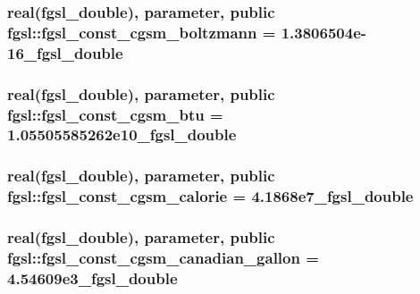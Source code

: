 \hypertarget{classfgsl_abe34761700d2098a3dcde1e962938eb4}{
\subsubsection[{fgsl\-\_\-const\-\_\-cgsm\-\_\-boltzmann}]{\setlength{\rightskip}{0pt plus 5cm}real({\bf fgsl\-\_\-double}), parameter, public fgsl\-::fgsl\-\_\-const\-\_\-cgsm\-\_\-boltzmann = 1.\-3806504e-\/16\-\_\-fgsl\-\_\-double}}\label{classfgsl_abe34761700d2098a3dcde1e962938eb4}
\hypertarget{classfgsl_a01479e6b5bfdbc02efb80e985ca837a6}{
\subsubsection[{fgsl\-\_\-const\-\_\-cgsm\-\_\-btu}]{\setlength{\rightskip}{0pt plus 5cm}real({\bf fgsl\-\_\-double}), parameter, public fgsl\-::fgsl\-\_\-const\-\_\-cgsm\-\_\-btu = 1.\-05505585262e10\-\_\-fgsl\-\_\-double}}\label{classfgsl_a01479e6b5bfdbc02efb80e985ca837a6}
\hypertarget{classfgsl_a82882b4ac09d9b5f5cd25cff0daa2119}{
\subsubsection[{fgsl\-\_\-const\-\_\-cgsm\-\_\-calorie}]{\setlength{\rightskip}{0pt plus 5cm}real({\bf fgsl\-\_\-double}), parameter, public fgsl\-::fgsl\-\_\-const\-\_\-cgsm\-\_\-calorie = 4.\-1868e7\-\_\-fgsl\-\_\-double}}\label{classfgsl_a82882b4ac09d9b5f5cd25cff0daa2119}
\hypertarget{classfgsl_a3a07299d97f40e47785e44126a457907}{
\subsubsection[{fgsl\-\_\-const\-\_\-cgsm\-\_\-canadian\-\_\-gallon}]{\setlength{\rightskip}{0pt plus 5cm}real({\bf fgsl\-\_\-double}), parameter, public fgsl\-::fgsl\-\_\-const\-\_\-cgsm\-\_\-canadian\-\_\-gallon = 4.\-54609e3\-\_\-fgsl\-\_\-double}}\label{classfgsl_a3a07299d97f40e47785e44126a457907}
